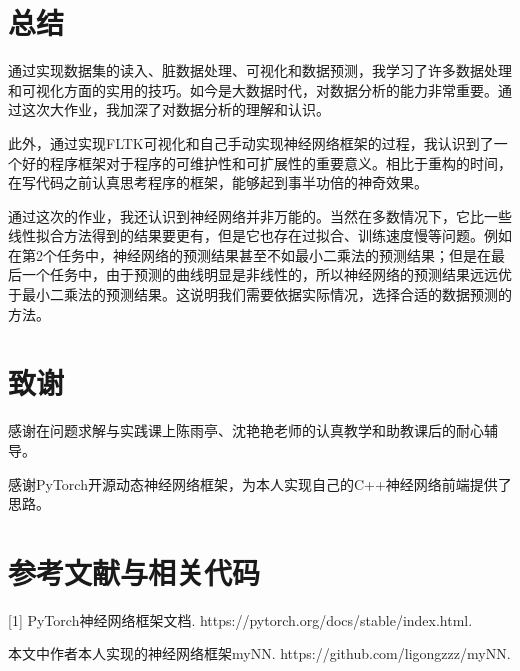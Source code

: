 \documentclass[CJK]{ctexart}
\begin{document}
\section{总结}
通过实现数据集的读入、脏数据处理、可视化和数据预测，我学习了许多数据处理和可视化方面的实用的技巧。如今是大数据时代，对数据分析的能力非常重要。通过这次大作业，我加深了对数据分析的理解和认识。\par
此外，通过实现FLTK可视化和自己手动实现神经网络框架的过程，我认识到了一个好的程序框架对于程序的可维护性和可扩展性的重要意义。相比于重构的时间，在写代码之前认真思考程序的框架，能够起到事半功倍的神奇效果。\par
通过这次的作业，我还认识到神经网络并非万能的。当然在多数情况下，它比一些线性拟合方法得到的结果要更有，但是它也存在过拟合、训练速度慢等问题。例如在第2个任务中，神经网络的预测结果甚至不如最小二乘法的预测结果；但是在最后一个任务中，由于预测的曲线明显是非线性的，所以神经网络的预测结果远远优于最小二乘法的预测结果。这说明我们需要依据实际情况，选择合适的数据预测的方法。

\section{致谢}
感谢在问题求解与实践课上陈雨亭、沈艳艳老师的认真教学和助教课后的耐心辅导。\par
感谢PyTorch开源动态神经网络框架，为本人实现自己的C++神经网络前端提供了思路。

\section{参考文献与相关代码}
[1] PyTorch神经网络框架文档. https://pytorch.org/docs/stable/index.html.\par
[2]本文中作者本人实现的神经网络框架myNN. https://github.com/ligongzzz/myNN. 
\end{document}

